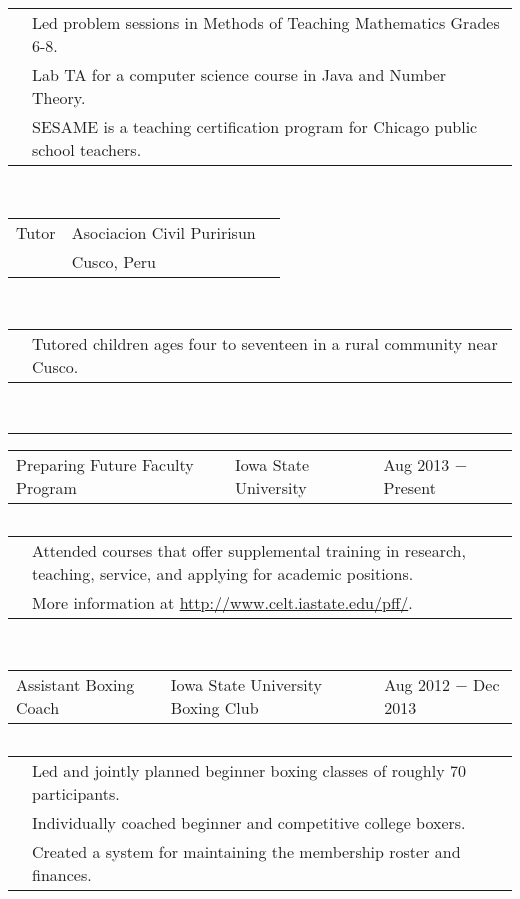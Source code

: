 \documentclass{article}
\newcommand{\q}{$\quad$ \newline}
\newcommand{\vl}{4.25}
\newcommand{\wl}{8.4}
\newcommand{\ww}{13}
\newcommand{\myrule}{\noindent \rule{\textwidth}{1pt}}
\begin{document}
\noindent \begin{tabular}{@{}p{\vl cm}p{\ww cm}@{}}
& Led problem sessions in Methods of Teaching Mathematics Grades 6-8. \\
& Lab TA for a computer science course in Java and Number Theory. \\
& SESAME is a teaching certification program for Chicago public school teachers.
\end{tabular} \q \q  

\noindent \begin{tabular}{@{}p{\vl cm}p{\wl cm}l@{}}
Tutor & Asociacion Civil Puririsun & \\
& Cusco, Peru
\end{tabular} \q \q

\noindent \begin{tabular}{@{}p{\vl cm}p{\ww cm}@{}}
& Tutored children ages four to seventeen in a rural community near Cusco.
\end{tabular} \q \q


\myrule


\noindent \begin{tabular}{@{}p{\vl cm}p{\wl cm}l@{}}
Preparing Future Faculty Program & Iowa State University & Aug 2013 $-$ Present
\end{tabular} \q 
 
\noindent \begin{tabular}{@{}p{\vl cm}p{\ww cm}@{}}
& Attended courses that offer supplemental training in research, teaching, service, and applying for academic positions. \\
& More information at \url{http://www.celt.iastate.edu/pff/}.
\end{tabular} \q \q
 
 
 
 
\noindent \begin{tabular}{@{}p{\vl cm}p{\wl cm}l@{}}
Assistant Boxing Coach & Iowa State University Boxing Club & Aug 2012 $-$ Dec 2013
\end{tabular} \q 
 
\noindent \begin{tabular}{@{}p{\vl cm}p{\ww cm}@{}}
& Led and jointly planned beginner boxing classes of roughly 70 participants. \\
& Individually coached beginner and competitive college boxers. \\
& Created a system for maintaining the membership roster and finances. \\
\end{tabular} \q \q
\end{document}
